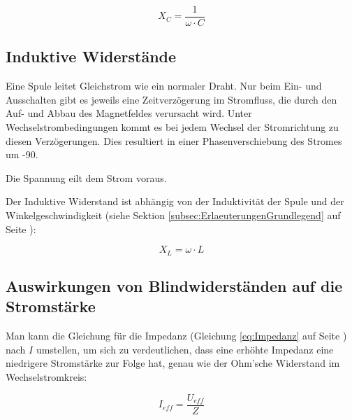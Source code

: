 \begin{equation}	\label{eq:KapazitiverWiderstand}
	X_C = \frac{1}{\omega \cdot C}
\end{equation}


\subsection{Induktive Widerstände}		\label{subsec:InduktiverWiderstand}

Eine Spule leitet Gleichstrom wie ein normaler Draht. Nur beim Ein- und Ausschalten gibt es jeweils eine Zeitverzögerung im Stromfluss, die durch den Auf- und Abbau des Magnetfeldes verursacht wird. Unter Wechselstrombedingungen kommt es bei jedem Wechsel der Stromrichtung zu diesen Verzögerungen. Dies resultiert in einer Phasenverschiebung des Stromes um -90\degree .\footnotemark


\glqq Die Spannung eilt dem Strom voraus.\grqq

\vspace{11pt}

Der \glqq Induktive Widerstand\grqq{} ist abhängig von der Induktivität der Spule und der Winkelgeschwindigkeit (siehe Sektion \ref{subsec:ErlaeuterungenGrundlegend} auf Seite \pageref{subsec:ErlaeuterungenGrundlegend}):

\begin{equation}	\label{eq:InduktiverWiderstand}
	X_L = \omega \cdot  L
\end{equation}



\subsection{Auswirkungen von Blindwiderständen auf die Stromstärke} \label{subsec:AuswirkungenWiderstand}

Man kann die Gleichung für die Impedanz (Gleichung \ref{eq:Impedanz} auf Seite \pageref{eq:Impedanz}) nach $I$ umstellen, um sich zu verdeutlichen, dass eine erhöhte Impedanz eine niedrigere Stromstärke zur Folge hat, genau wie der Ohm'sche Widerstand im Wechselstromkreis:

\begin{equation}	\label{eq:ImitZ}
	I_{eff}=\frac{U_{eff}}{Z}
\end{equation}


